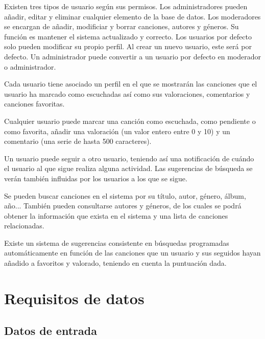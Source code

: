 \documentclass[11pt,a4paper]{article}
\begin{document}
Existen tres tipos de usuario según sus permisos. Los administradores pueden añadir, editar y eliminar cualquier elemento de la base de datos. Los moderadores se encargan de añadir, modificiar y borrar canciones, autores y géneros. Su función es mantener el sistema actualizado y correcto. Los usuarios por defecto solo pueden modificar su propio perfil. Al crear un nuevo usuario, este será por defecto. Un administrador puede convertir a un usuario por defecto en moderador o administrador.

Cada usuario tiene asociado un perfil en el que se mostrarán las canciones que el usuario ha marcado como escuchadas así como sus valoraciones, comentarios y canciones favoritas. 


Cualquier usuario puede marcar una canción como escuchada, como pendiente o como favorita, añadir una valoración (un valor entero entre 0 y 10) y un comentario (una serie de hasta 500 caracteres). 

Un usuario puede seguir a otro usuario, teniendo así una notificación de cuándo el usuario al que sigue realiza alguna actividad. Las sugerencias de búsqueda se verán también influidas por los usuarios a los que se sigue. 



Se pueden buscar canciones en el sistema por su título, autor, género, álbum, año... También pueden consultarse autores y géneros, de los cuales se podrá obtener la información que exista en el sistema y una lista de canciones relacionadas. 

Existe un sistema de sugerencias consistente en búsquedas programadas automáticamente en función de las canciones que un usuario y sus seguidos hayan añadido a favoritos y valorado, teniendo en cuenta la puntuación dada.

\section{Requisitos de datos}
\subsection{Datos de entrada}
\end{document}

